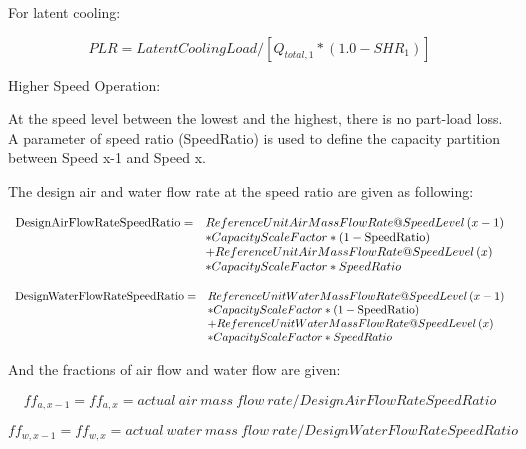 For latent cooling:

\begin{equation}
PLR = LatentCoolingLoad/[{Q_{total,1}}*(1.0 - SH{R_1})]
\end{equation}

Higher Speed Operation:

At the speed level between the lowest and the highest, there is no part-load loss. A parameter of speed ratio (SpeedRatio) is used to define the capacity partition between Speed x-1 and Speed x.

The design air and water flow rate at the speed ratio are given as following:

\begin{equation}
  \begin{array}{rl}
    {\rm{DesignAirFlowRateSpeedRatio}} =& ReferenceUnitAirMassFlowRate@SpeedLevel\left( {x - 1} \right) \\
                                       &* CapacityScaleFactor * \left( {1-\rm{SpeedRatio}} \right) \\
                                       &+ ReferenceUnitAirMassFlowRate@SpeedLevel\left( x \right) \\
                                       &* CapacityScaleFactor * SpeedRatio
  \end{array}
\end{equation}

\begin{equation}
  \begin{array}{rl}
    \rm{DesignWaterFlowRateSpeedRatio} =& ReferenceUnitWaterMassFlowRate@SpeedLevel\left( {x - 1} \right) \\
                                        &* CapacityScaleFactor * \left( {1-\rm{SpeedRatio}} \right) \\
                                        &+ ReferenceUnitWaterMassFlowRate@SpeedLevel\left( x \right) \\
                                        &* CapacityScaleFactor * SpeedRatio
  \end{array}
\end{equation}

And the fractions of air flow and water flow are given:

\begin{equation}
ff_{a,x-1} = ff_{a,x} = actual~air~mass~flow~rate/DesignAirFlowRateSpeedRatio
\end{equation}

\begin{equation}
ff_{w,x-1} = ff_{w,x} = actual~water~mass~flow~rate/DesignWaterFlowRateSpeedRatio
\end{equation}

